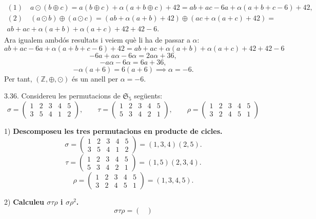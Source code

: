 \documentclass[11pt]{article}
\begin{document}
\begin{legal}
\begin{legal}
		\[
		\begin{array}{lcl}
			(1)\quad a\odot(b\oplus c)=a(b\oplus c)+\alpha(a+b\oplus c)+42=ab+ac-6a+\alpha(a+b+c-6)+42,\\
			(2)\quad (a\odot b)\oplus(a\odot c)=(ab+\alpha(a+b)+42)\oplus(ac+\alpha(a+c)+42)=\\
			ab+ac+\alpha(a+b)+\alpha(a+c)+42+42-6.
		\end{array}
		\]
		Ara igualem ambdós resultats i veiem què li ha de passar a $\alpha$:
		$$
		ab+ac-6a+\alpha(a+b+c-6)+42=ab+ac+\alpha(a+b)+\alpha(a+c)+42+42-6
		$$
		$$
		-6a+a\alpha-6\alpha=2a\alpha+36,
		$$
		$$
		-a\alpha-6\alpha=6a+36,
		$$
		$$
		-\alpha(a+6)=6(a+6)\implies \alpha=-6.
		$$
		Per tant, $(\mathbb{Z},\oplus,\odot)$ és un anell per $\alpha=-6$.
	\end{legal}\newpage
\item[3.36.] Considereu les permutacions de $\mathfrak{S}_5$ següents:
	$$
	\sigma=
	\begin{pmatrix}
		1 & 2 & 3 & 4 & 5\\
		3 & 5 & 4 & 1 & 2
	\end{pmatrix},
	\qquad
	\tau=
	\begin{pmatrix}
		1 & 2 & 3 & 4 & 5\\
		5 & 3 & 4 & 2 & 1
	\end{pmatrix},
	\qquad
	\rho=
	\begin{pmatrix}
		1 & 2 & 3 & 4 & 5\\
		3 & 2 & 4 & 5 & 1
	\end{pmatrix}
	$$
	\begin{legal}
		\item[1) ]\textbf{Descomposeu les tres permutacions en producte de cicles.}
		$$\sigma=
		\begin{pmatrix}
			1 & 2 & 3 & 4 & 5\\
			3 & 5 & 4 & 1 & 2
		\end{pmatrix}
		=(1,3,4)(2,5).
		$$
		$$\tau=
		\begin{pmatrix}
			1 & 2 & 3 & 4 & 5\\
			5 & 3 & 4 & 2 & 1
		\end{pmatrix}
		=(1,5)(2,3,4).
		$$
		$$\rho=
		\begin{pmatrix}
			1 & 2 & 3 & 4 & 5\\
			3 & 2 & 4 & 5 & 1
		\end{pmatrix}
		=(1,3,4,5).
		$$
		\item[2) ]\textbf{Calculeu $\sigma\tau\rho$ i $\sigma\rho^2$.}
		$$
		\sigma\tau\rho=\begin{pmatrix}

\end{pmatrix}$$
\end{legal}
\end{legal}
\end{document}
